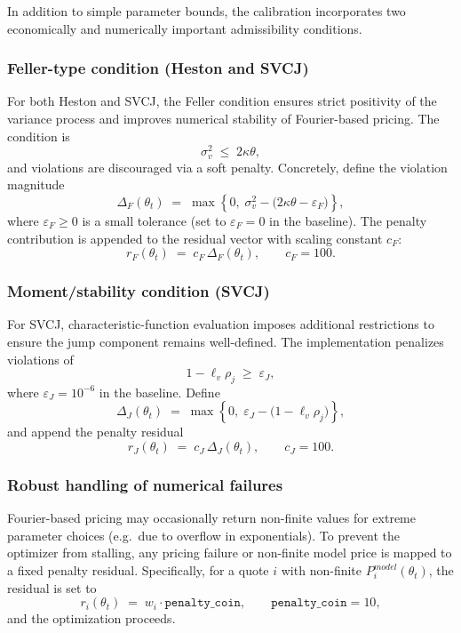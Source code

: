 \documentclass[a4paper,titlepage,12pt]{report}
\theoremstyle{plain}
\begin{document}
In addition to simple parameter bounds, the calibration incorporates two economically and numerically important admissibility conditions.

\subsubsection{Feller-type condition (Heston and SVCJ)}

For both Heston and SVCJ, the Feller condition \citep{Heston1993} ensures strict positivity of the variance process and improves numerical stability of Fourier-based pricing. The condition is
\begin{equation}\label{eq:feller}
\sigma_v^2 \;\le\; 2\kappa\theta,
\end{equation}
and violations are discouraged via a soft penalty. Concretely, define the violation magnitude
\[
\Delta_F(\theta_t) \;=\; \max\!\left\{0,\; \sigma_v^2 - \bigl(2\kappa\theta - \varepsilon_F\bigr)\right\},
\]
where $\varepsilon_F \ge 0$ is a small tolerance (set to $\varepsilon_F = 0$ in the baseline). The penalty contribution is appended to the residual vector with scaling constant $c_F$:
\[
r_F(\theta_t) \;=\; c_F \, \Delta_F(\theta_t),
\qquad c_F = 100.
\]

\subsubsection{Moment/stability condition (SVCJ)}

For SVCJ, characteristic-function evaluation imposes additional restrictions to ensure the jump component remains well-defined. The implementation penalizes violations of
\begin{equation}\label{eq:moment}
1 - \ell_v \rho_j \;\ge\; \varepsilon_J,
\end{equation}
where $\varepsilon_J = 10^{-6}$ in the baseline. Define
\[
\Delta_J(\theta_t) \;=\; \max\!\left\{0,\; \varepsilon_J - \bigl(1-\ell_v\rho_j\bigr)\right\},
\]
and append the penalty residual
\[
r_J(\theta_t) \;=\; c_J \, \Delta_J(\theta_t),
\qquad c_J = 100.
\]

\subsubsection{Robust handling of numerical failures}

Fourier-based pricing may occasionally return non-finite values for extreme parameter choices (e.g.\ due to overflow in exponentials). To prevent the optimizer from stalling, any pricing failure or non-finite model price is mapped to a fixed penalty residual. Specifically, for a quote $i$ with non-finite $P^{model}_i(\theta_t)$, the residual is set to
\[
r_i(\theta_t) \;=\; w_i \cdot \texttt{penalty\_coin},
\qquad \texttt{penalty\_coin}=10,
\]
and the optimization proceeds.
\end{document}
